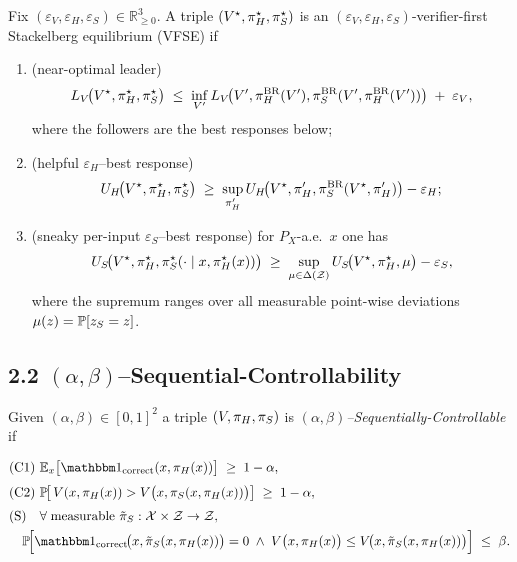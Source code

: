 \begin{definition}
Fix $(\varepsilon_V,\varepsilon_H,\varepsilon_S)\in\mathbb R_{\ge 0}^3$.
A triple $(V^\star,\pi_H^\star,\pi_S^\star)$ is an $(\varepsilon_V,\varepsilon_H,\varepsilon_S)$-verifier-first
Stackelberg equilibrium (VFSE) if

\begin{enumerate}
\item[(V)] (near-optimal leader)
      \[
      L_V\!\bigl(V^\star,\pi_H^\star,\pi_S^\star\bigr)
      \;\le\;
      \inf_{V'}L_V\!\bigl(V',\pi_H^{\operatorname{BR}}(V'),\pi_S^{\operatorname{BR}}(V',\pi_H^{\operatorname{BR}}(V'))\bigr)
      \;+\;\varepsilon_V,
      \]
      where the followers are the best responses below;
\item[(H)] (helpful $\varepsilon_H$–best response)
      \[
      U_H\!\bigl(V^\star,\pi_H^\star,\pi_S^\star\bigr)
      \;\ge\;
      \sup_{\pi_H'}U_H\!\bigl(V^\star,\pi_H',\pi_S^{\operatorname{BR}}(V^\star,\pi_H')\bigr)-\varepsilon_H;
      \]
\item[(S)] (sneaky per-input $\varepsilon_S$–best response)
      for $P_X$-a.e.\ $x$ one has
      \[
      U_S\!\bigl(V^\star,\pi_H^\star,
                 \pi_S^\star(\cdot\mid x,\pi_H^\star(x))\bigr)
      \;\ge\;
      \sup_{\mu\in\Delta(\mathcal Z)}
        U_S\!\bigl(V^\star,\pi_H^\star,\mu\bigr)-\varepsilon_S,
      \]
      where the supremum ranges over all measurable point-wise deviations
      $\mu(z)=\mathbb P[z_S=z]$.\qedhere
\end{enumerate}
\end{definition}

\subsection*{2.2 \; $(\alpha,\beta)$–Sequential-Controllability}

\begin{definition}
Given $(\alpha,\beta)\in[0,1]^2$
a triple $(V,\pi_H,\pi_S)$ is \emph{$(\alpha,\beta)$–Sequentially-Controllable} if

\[
\begin{aligned}
&\text{(C1) }
\EE_x\bigl[\corr(x,\dH(x))\bigr]\;\ge\;1-\alpha,\\[3pt]
&\text{(C2) }
\PP\!\bigl[\,V(x,\dH(x))>V\bigl(x,\dS(x,\dH(x))\bigr)\bigr]\;\ge\;1-\alpha,\\[3pt]
&\text{(S)}\quad
\forall\; \text{measurable } \dSt:\mathcal X\times\mathcal Z\to\mathcal Z, \\
&\quad
\PP\!\Bigl[\corr\!\bigl(x,\dSt(x,\dH(x))\bigr)=0
          \;\wedge\;
          V\bigl(x,\dH(x)\bigr)\le
          V\!\bigl(x,\dSt(x,\dH(x))\bigr)\Bigr]
          \;\le\;\beta.
\end{aligned}
\]
\end{definition}

